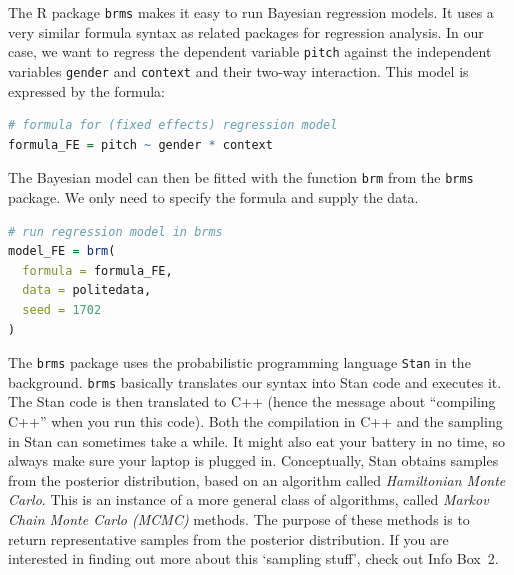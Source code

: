 \documentclass[nobib]{tufte-handout}
\begin{document}
The R package \texttt{brms} \citep{buerkner2016brms} makes it easy to run Bayesian regression models. It uses a very similar formula syntax as related packages for regression analysis. In our case, we want to regress the dependent variable \texttt{pitch} against the independent variables \texttt{gender} and \texttt{context} and their two-way interaction. This model is expressed by the formula:

\bigskip

\begin{minipage}[]{\textwidth}
\begin{lstlisting}[language=R]
# formula for (fixed effects) regression model
formula_FE = pitch ~ gender * context
\end{lstlisting}
\end{minipage}

The Bayesian model can then be fitted with the function \texttt{brm} from the \texttt{brms} package. We only need to specify the formula and supply the data.

\bigskip

\begin{minipage}[]{\textwidth}
\begin{lstlisting}[language=R]
# run regression model in brms
model_FE = brm(
  formula = formula_FE, 
  data = politedata, 
  seed = 1702 
)
\end{lstlisting}
\end{minipage}

\noindent The \texttt{brms} package uses the probabilistic programming language \texttt{Stan}
in the background. \texttt{brms} basically translates our syntax into Stan code and
executes it. The Stan code  is then translated to C++ (hence the message about ``compiling
C++'' when you run this code). Both the compilation in C++ and the sampling in Stan can sometimes take a while. It might also eat your battery in no time, so always make sure your laptop is plugged in. 
Conceptually, Stan obtains samples from the posterior distribution, based on an algorithm called \emph{Hamiltonian Monte Carlo}. This is an instance
of a more general class of algorithms, called \emph{Markov Chain Monte Carlo (MCMC)} methods. The purpose of these methods is to return representative samples from the posterior distribution.
If you are interested in finding out more about this `sampling stuff', check out Info Box~2.
\end{document}
